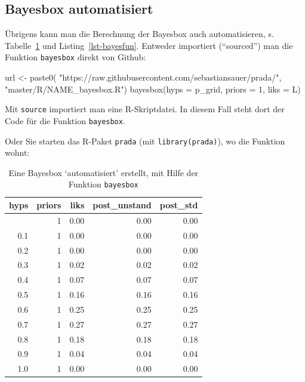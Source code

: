 \documentclass[
  ngerman,
  letterpaper,
  twoside,
  open=any]{scrbook}
\newenvironment{Shaded}{\begin{snugshade}}{\end{snugshade}}
\newcommand{\AttributeTok}[1]{\textcolor[rgb]{0.40,0.45,0.13}{#1}}
\newcommand{\DecValTok}[1]{\textcolor[rgb]{0.68,0.00,0.00}{#1}}
\newcommand{\FunctionTok}[1]{\textcolor[rgb]{0.28,0.35,0.67}{#1}}
\newcommand{\NormalTok}[1]{\textcolor[rgb]{0.00,0.23,0.31}{#1}}
\newcommand{\OtherTok}[1]{\textcolor[rgb]{0.00,0.23,0.31}{#1}}
\newcommand{\StringTok}[1]{\textcolor[rgb]{0.13,0.47,0.30}{#1}}
\theoremstyle{definition}
\theoremstyle{plain}
\theoremstyle{definition}
\theoremstyle{definition}
\theoremstyle{definition}
\theoremstyle{definition}
\theoremstyle{remark}
\begin{document}
\subsection{Bayesbox automatisiert}\label{bayesbox-automatisiert}

Übrigens kann man die Berechnung der Bayesbox auch automatisieren, s.
Tabelle~\ref{tbl-bayes-fun} und Listing~\ref{lst-bayesfun}. Entweder
importiert (\enquote{sourced}) man die Funktion \texttt{bayesbox} direkt
von Github:

\begin{Shaded}
\begin{Highlighting}[]
\NormalTok{url }\OtherTok{\textless{}{-}} \FunctionTok{paste0}\NormalTok{(}
  \StringTok{"https://raw.githubusercontent.com/sebastiansauer/prada/"}\NormalTok{,}
  \StringTok{"master/R/NAME\_bayesbox.R"}\NormalTok{)}
\FunctionTok{bayesbox}\NormalTok{(}\AttributeTok{hyps =}\NormalTok{ p\_grid, }\AttributeTok{priors =} \DecValTok{1}\NormalTok{, }\AttributeTok{liks =}\NormalTok{ L) }
\end{Highlighting}
\end{Shaded}

Mit \texttt{source} importiert man eine R-Skriptdatei. In diesem Fall
steht dort der Code für die Funktion \texttt{bayesbox}.

Oder Sie starten das R-Paket \texttt{prada} (mit
\texttt{library(prada)}), wo die Funktion wohnt:

{

\begin{longtable}[]{@{}rrrrr@{}}

\caption{\label{tbl-bayes-fun}Eine Bayesbox \enquote*{automatisiert}
erstellt, mit Hilfe der Funktion \texttt{bayesbox}}

\tabularnewline

\toprule\noalign{}
hyps & priors & liks & post\_unstand & post\_std \\
\midrule\noalign{}
\endhead
\bottomrule\noalign{}
\endlastfoot
0.0 & 1 & 0.00 & 0.00 & 0.00 \\
0.1 & 1 & 0.00 & 0.00 & 0.00 \\
0.2 & 1 & 0.00 & 0.00 & 0.00 \\
0.3 & 1 & 0.02 & 0.02 & 0.02 \\
0.4 & 1 & 0.07 & 0.07 & 0.07 \\
0.5 & 1 & 0.16 & 0.16 & 0.16 \\
0.6 & 1 & 0.25 & 0.25 & 0.25 \\
0.7 & 1 & 0.27 & 0.27 & 0.27 \\
0.8 & 1 & 0.18 & 0.18 & 0.18 \\
0.9 & 1 & 0.04 & 0.04 & 0.04 \\
1.0 & 1 & 0.00 & 0.00 & 0.00 \\

\end{longtable}

}
\end{document}
